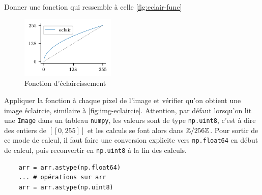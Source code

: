 \quessques Donner une fonction qui ressemble à celle \autoref{fig:eclair-func}

\begin{figure}[h!]
    \begin{center}
        \includegraphics[width=0.4\textwidth]{figures/eclair.png}
    \end{center}
    \caption{Fonction d'éclaircissement}
    \label{fig:eclair-func}
\end{figure}

\ssques Appliquer la fonction à chaque pixel de l'image et vérifier qu'on obtient une image éclaircie, similaire à \autoref{fig:img-eclaircie}. Attention, par défaut lorsqu'on lit une \texttt{Image} dans un tableau \texttt{numpy}, les valeurs sont de type \texttt{np.uint8}, c'est à dire des entiers de $ [\![0, 255]\!] $ et les calculs se font alors dans $ \mathbb{Z} / 256 \mathbb{Z} $. Pour sortir de ce mode de calcul, il faut faire une conversion explicite vers \texttt{np.float64} en début de calcul, puis reconvertir en \texttt{np.uint8} à la fin des calculs.

\begin{verbatim}
    arr = arr.astype(np.float64)
    ... # opérations sur arr
    arr = arr.astype(np.uint8)
\end{verbatim}


